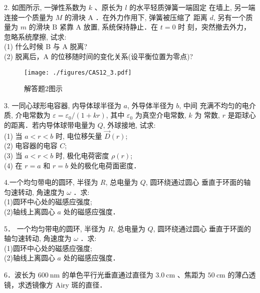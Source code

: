 2. 如图所示, 一弹性系数为 $k$ 、原长为 $l$ 的水平轻质弹簧一端固定 在墙上, 另一端连接一个质量为 $M$ 的滑块 $\mathrm{A}$ ．在外力作用下, 弹簧被压缩了 距离 $d$, 另有一个质量为 $m$ 的滑块 $\mathrm{B}$ 紧靠 $\mathrm{A}$ 放置, 系统保持静止．在 $t=0$ 时 刻，突然撤去外力，忽略系统摩擦, 试求:\\
(1) 什么时候 B 与 A 脱离?\\
(2) 脱离后，A 的位移随时间的变化关系(设平衡位置为零点)?
\begin{figure}[ht]
\centering
\texttt{[image: ./figures/CAS12\_3.pdf]}
\caption{解答题2图示} \label{CAS12_fig3}
\end{figure}
3. 一同心球形电容器, 内导体球半径为 $a$, 外导体半径为 $b$, 中间 充满不均匀的电介质, 介电常数为 $\varepsilon=\varepsilon_{0} /(1+k r)$, 其中 $\varepsilon_{0}$ 为真空介电常数, $k$ 为 常数, $r$ 是距球心的距离．若内导体球带电量为 $Q$, 外球接地, 试求:\\
(1) 当 $a<r< b$ 时, 电位移矢量 $\vec{D}(r)$; \\
(2) 电容器的电容 $C$; \\
(3) 当 $a<r< b$ 时, 极化电荷密度 $\rho(r)$; \\
(4) 在 $r=a$ 和 $r=b$ 处的极化电荷面密度．

4.一个均匀带电的圆环, 半径为 $R$, 总电量为 $Q$, 圆环绕通过圆心
垂直于环面的轴匀速转动, 角速度为 $\omega$ ．求:\\
(1)圆环中心处的磁感应强度;\\
(2)轴线上离圆心 $a$ 处的磁感应强度．

5． 一个均匀带电的圆环, 半径为 $R$, 总电量为 $Q$, 圆环绕通过圆心 垂直于环面的轴匀速转动, 角速度为 $\omega$ ．求:\\
(1)圆环中心处的磁感应强度;\\
(2)轴线上离圆心 $a$ 处的磁感应强度．

6．波长为 $600 \mathrm{~nm}$ 的单色平行光垂直通过直径为 $3.0 \mathrm{~cm}$ 、焦距为 $50 \mathrm{~cm}$ 的薄凸透镜，求透镜像方 Airy 斑的直径．